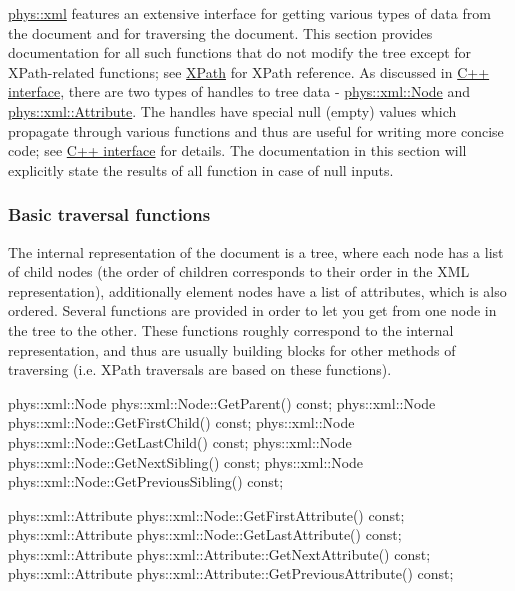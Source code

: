 \hyperlink{namespacephys_1_1xml}{phys::xml} features an extensive interface for getting various types of data from the document and for traversing the document. This section provides documentation for all such functions that do not modify the tree except for XPath-\/related functions; see \hyperlink{XMLManual_XMLXPath}{XPath} for XPath reference. As discussed in \hyperlink{XMLManual_XMLInterface}{C++ interface}, there are two types of handles to tree data -\/ \hyperlink{classphys_1_1xml_1_1Node}{phys::xml::Node} and \hyperlink{classphys_1_1xml_1_1Attribute}{phys::xml::Attribute}. The handles have special null (empty) values which propagate through various functions and thus are useful for writing more concise code; see \hyperlink{XMLManual_XMLInterface}{C++ interface} for details. The documentation in this section will explicitly state the results of all function in case of null inputs. \hypertarget{XMLManual_XMLAccessingBasics}{}\subsubsection{Basic traversal functions}\label{XMLManual_XMLAccessingBasics}
The internal representation of the document is a tree, where each node has a list of child nodes (the order of children corresponds to their order in the XML representation), additionally element nodes have a list of attributes, which is also ordered. Several functions are provided in order to let you get from one node in the tree to the other. These functions roughly correspond to the internal representation, and thus are usually building blocks for other methods of traversing (i.e. XPath traversals are based on these functions). 
\begin{DoxyCode}
 phys::xml::Node phys::xml::Node::GetParent() const;
 phys::xml::Node phys::xml::Node::GetFirstChild() const;
 phys::xml::Node phys::xml::Node::GetLastChild() const;
 phys::xml::Node phys::xml::Node::GetNextSibling() const;
 phys::xml::Node phys::xml::Node::GetPreviousSibling() const;

 phys::xml::Attribute phys::xml::Node::GetFirstAttribute() const;
 phys::xml::Attribute phys::xml::Node::GetLastAttribute() const;
 phys::xml::Attribute phys::xml::Attribute::GetNextAttribute() const;
 phys::xml::Attribute phys::xml::Attribute::GetPreviousAttribute() const;
\end{DoxyCode}
